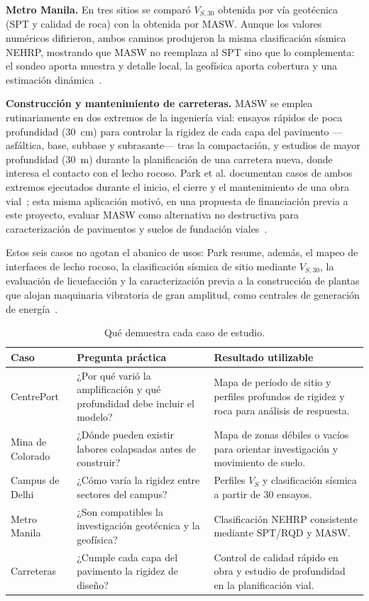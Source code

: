 \textbf{Metro Manila.} En tres sitios se comparó $V_{S,30}$ obtenida por vía geotécnica
(SPT y calidad de roca) con la obtenida por MASW. Aunque los valores numéricos difirieron,
ambos caminos produjeron la misma clasificación sísmica NEHRP, mostrando que MASW no
reemplaza al SPT sino que lo complementa: el sondeo aporta muestra y detalle local, la
geofísica aporta cobertura y una estimación dinámica~\cite{Monjardin2023}.

\textbf{Construcción y mantenimiento de carreteras.} MASW se emplea rutinariamente en
dos extremos de la ingeniería vial: ensayos rápidos de poca profundidad
(\SI{30}{\centi\meter}) para controlar la rigidez de cada capa del pavimento
---asfáltica, base, subbase y subrasante--- tras la compactación, y estudios de mayor
profundidad (\SI{30}{\meter}) durante la planificación de una carretera nueva, donde
interesa el contacto con el lecho rocoso. Park et al. documentan casos de ambos extremos
ejecutados durante el inicio, el cierre y el mantenimiento de una obra
vial~\cite{Park2018Roads}; esta misma aplicación motivó, en una propuesta de
financiación previa a este proyecto, evaluar MASW como alternativa no destructiva para
caracterización de pavimentos y suelos de fundación viales~\cite{PINV01317}.

Estos seis casos no agotan el abanico de usos: Park resume, además, el mapeo de
interfaces de lecho rocoso, la clasificación sísmica de sitio mediante $V_{S,30}$, la
evaluación de licuefacción y la caracterización previa a la construcción de plantas que
alojan maquinaria vibratoria de gran amplitud, como centrales de generación de
energía~\cite{Park2013}.

\begin{table}[ht]
\centering
\small
\caption{Qué demuestra cada caso de estudio.}
\begin{tabularx}{\textwidth}{@{}>{\raggedright\arraybackslash}p{} Y Y@{}}
\toprule
\textbf{Caso} & \textbf{Pregunta práctica} & \textbf{Resultado utilizable} \\
\midrule
CentrePort & ¿Por qué varió la amplificación y qué profundidad debe incluir el modelo? & Mapa de período de sitio y perfiles profundos de rigidez y roca para análisis de respuesta. \\
Mina de Colorado & ¿Dónde pueden existir labores colapsadas antes de construir? & Mapa de zonas débiles o vacíos para orientar investigación y movimiento de suelo. \\
Campus de Delhi & ¿Cómo varía la rigidez entre sectores del campus? & Perfiles $V_S$ y clasificación sísmica a partir de 30 ensayos. \\
Metro Manila & ¿Son compatibles la investigación geotécnica y la geofísica? & Clasificación NEHRP consistente mediante SPT/RQD y MASW. \\
Carreteras & ¿Cumple cada capa del pavimento la rigidez de diseño? & Control de calidad rápido en obra y estudio de profundidad en la planificación vial. \\
\bottomrule
\end{tabularx}
\end{table}

